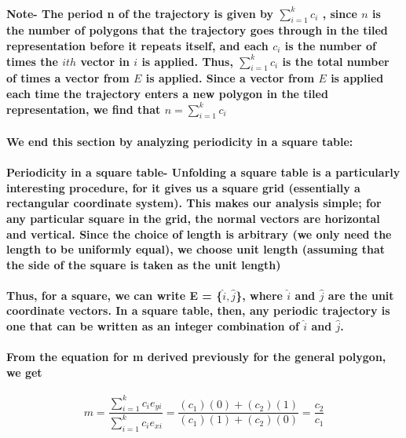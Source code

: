 \documentclass{report}
\begin{document}
\paragraph{Note- The period n of the trajectory is given by $\sum_{i=1}^k c_i$ , since $n$ is the number of polygons that the trajectory goes through in the tiled representation before it repeats itself, and each $c_i$ is the number of times the $ith$ vector in $i$ is applied. Thus, $\sum_{i=1}^k c_i$ is the total number of times a vector from $E$ is applied. Since a vector from $E$ is applied each time the trajectory enters a new polygon in the tiled representation, we find that $n = \sum_{i=1}^k c_i$
}

\paragraph{We end this section by analyzing periodicity in a square table:}

\paragraph{Periodicity in a square table- Unfolding a square table is a particularly interesting procedure, for it gives us a square grid (essentially a rectangular coordinate system). This makes our analysis simple; for any particular square in the grid, the normal vectors are horizontal and vertical. Since the choice of length is arbitrary (we only need the length to be uniformly equal), we choose unit length (assuming that the side of the square is taken as the unit length)}

\paragraph{Thus, for a square, we can write E = \{$\hat{i},\hat{j}$\}, where $\hat{i}$ and $\hat{j}$ are the unit coordinate vectors. In a square table, then, any periodic trajectory is one that can be written as an integer combination of $\hat{i}$ and $\hat{j}$.}

\paragraph{From the equation for m derived previously for the general polygon, we get}

\begin{equation}
m=\frac{\sum_{i=1}^k  c_ie_{yi} }{\sum_{i=1}^k  c_ie_{xi} }=\frac{(c_1)(0)+(c_2)(1)}{(c_1)(1)+(c_2)(0)}=\frac{c_2}{c_1}
\end{equation}
\end{document}
